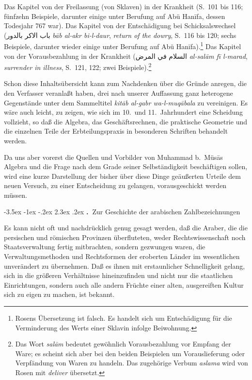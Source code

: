 \documentclass[11pt,a4paper]{article}
\makeatletter
\newcommand{\RL}[1]{\beginR#1\endR}
\renewcommand{\section}{\@startsection{section}{1}{\z@}%
  {-3.5ex \@plus -1ex \@minus -.2ex}%
  {2.3ex \@plus .2ex}%
  {\normalfont\Large\bfseries\color{sectioncolor}\thesection.\ }}
\newcommand{\ar}[1]{{\arabicfont\RL{#1}}}
\makeatother
\begin{document}
Das Kapitel von der Freilassung (von Sklaven) in der Krankheit (S.\ 101 bis 116; f\"unfzehn Beispiele, darunter einige unter Berufung auf Ab\"u Han\={i}fa, dessen Todesjahr 767 war). Das Kapitel von der Entsch\"adigung bei Schicksalswechsel (\ar{باب الاكر بالدور} \textit{b\=ab al-akr bi-l-daur}, \textit{return of the dowry}, S.\ 116 bis 120; sechs Beispiele, darunter wieder einige unter Berufung auf Ab\"u Han\={i}fa).\footnote{Rosens \"Ubersetzung ist falsch. Es handelt sich um Entsch\"adigung f\"ur die Verminderung des Werts einer Sklavin infolge Beiwohnung.} Das Kapitel von der Vorausbezahlung in der Krankheit (\ar{السلام في المرض} \textit{al-sal\=am f\=i{} l-marad}, \textit{surrender in illness}, S.\ 121, 122; zwei Beispiele).\footnote{Das Wort \textit{sal\=am} bedeutet gew\"ohnlich Vorausbezahlung vor Empfang der Ware; es scheint sich aber bei den beiden Beispielen um Vorauslieferung oder Verpf\"andung von Waren zu handeln. Das zugeh\"orige Verbum \textit{aslama} wird von Rosen mit \textit{deliver} \"ubersetzt.}

Schon diese Inhalts\"ubersicht kann zum Nachdenken \"uber die Gr\"unde anregen, die den Verfasser veranla\ss{}t haben, drei nach unserer Auffassung ganz heterogene Gegenst\"ande unter dem Sammeltitel \textit{kit\=ab al-gabr wa-l-muq\=abala} zu vereinigen. Es w\"are auch leicht, zu zeigen, wie sich im 10.\ und 11.\ Jahrhundert eine Scheidung vollzieht, so da\ss{} die Algebra, das Gesch\"aftsrechnen, die praktische Geometrie und die einzelnen Teile der Erbteilungspraxis in besonderen Schriften behandelt werden.

Da uns aber vorerst die Quellen und Vorbilder von Muhammad b.\ M\"us\=as Algebra und die Frage nach dem Grade seiner Selbst\"andigkeit besch\"aftigen sollen, wird eine kurze Darstellung der bisher \"uber diese Dinge ge\"au\ss{}erten Urteile dem neuen Versuch, zu einer Entscheidung zu gelangen, vorausgeschickt werden m\"ussen.

\clearpage

\section{Zur Geschichte der arabischen Zahlbezeichnungen}

Es kann nicht oft und nachdr\"ucklich genug gesagt werden, da\ss{} die Araber, die die persischen und r\"omischen Provinzen \"uberfluteten, weder Rechtswissenschaft noch Staatsverwaltung fertig mitbrachten, sondern gezwungen waren, die Verwaltungsmethoden und Rechtsformen der eroberten L\"ander im wesentlichen unver\"andert zu \"ubernehmen. Da\ss{} es ihnen mit erstaunlicher Schnelligkeit gelang, sich in die gr\"o\ss{}eren Verh\"altnisse hineinzufinden und nicht nur die staatlichen Einrichtungen, sondern auch alle andern Fr\"uchte einer alten, ausgereiften Kultur sich zu eigen zu machen, ist bekannt.
\end{document}
